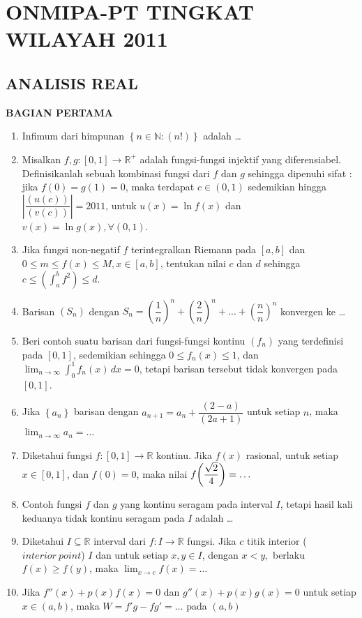 \documentclass[12pt,twoside]{article}
\begin{document}
\pagebreak

\section{ONMIPA-PT TINGKAT WILAYAH 2011}
\subsection{ANALISIS REAL}

\textbf{BAGIAN PERTAMA}

\begin{enumerate}
	\item Infimum dari himpunan $\left\lbrace n \in \mathbb{N} : (n!) \right\rbrace$ adalah \dots

	\item Misalkan $f,g : [0,1] \to \mathbb{R}^+$ adalah fungsi-fungsi injektif yang diferensiabel. Definisikanlah sebuah kombinasi fungsi dari $f$ dan $g$ sehingga dipenuhi sifat : jika $f(0) = g(1) = 0$, maka terdapat $c \in (0,1)$ sedemikian hingga $\displaystyle \left| \dfrac{(u(c))}{(v(c))}\right| = 2011 $, untuk $u(x) = \ln f(x)$ dan $v(x) = \ln g(x), \forall (0,1)$.

	\item Jika fungsi non-negatif $f$ terintegralkan Riemann pada $[a,b]$ dan $0 \leq m \leq f(x) \leq M, x \in [a,b]$, tentukan nilai $c$ dan $d$ sehingga $c \leq (\int_{a}^{b} f^2) \leq d$.

	\item Barisan $(S_n)$ dengan $S_n = \left(\dfrac{1}{n}\right)^n + \left(\dfrac{2}{n}\right)^n +\dots + \left(\dfrac{n}{n}\right)^n$ konvergen ke \dots

	\item Beri contoh suatu barisan dari fungsi-fungsi kontinu $(f_n)$ yang terdefinisi pada $[0,1]$, sedemikian sehingga $0 \leq f_n(x) \leq 1$, dan $\lim_{n \to \infty} \int_{0}^{1} f_n(x)\,dx = 0$, tetapi barisan tersebut tidak konvergen pada $[0,1]$.

	\item Jika $\left\lbrace a_n \right\rbrace $ barisan dengan $a_{n+1} = a_n + \dfrac{(2-a)}{(2a+1)}$ untuk setiap $n$, maka $\lim_{n \to \infty} a_n = \dots$

	\item Diketahui fungsi $f : [0,1] \to \mathbb{R} $ kontinu. Jika $f(x)$ rasional, untuk setiap $x \in [0,1]$, dan $f(0) = 0$, maka nilai $f\qty(\dfrac{\sqrt{2}}{4}) = \dots$
	\item Contoh fungsi $f$ dan $g$ yang kontinu seragam pada interval $I$, tetapi hasil kali keduanya tidak kontinu seragam pada $I$ adalah \dots

	\item Diketahui $I \subseteq \mathbb{R}$ interval dari $f : I \to \mathbb{R}$ fungsi. Jika $c$ titik interior ($interior~point$) $I$ dan untuk setiap $x,y \in I$, dengan $x < y,$ berlaku $f(x) \geq f(y)$, maka $\lim_{x \to c} f(x) = \dots$

	\item Jika $f''(x) + p(x)f(x)=0$ dan $g''(x)+p(x)g(x)=0$ untuk setiap $x \in (a,b)$, maka $W = f'g-fg' =\dots$ pada $(a,b)$
\end{enumerate}
\end{document}
